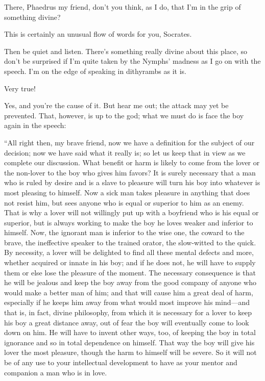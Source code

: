 There, Phaedrus my friend, don’t you think, as I do, that I’m in the
grip of something divine?

\sayphaedrus This is certainly an unusual flow of words for you, Socrates.

\saysocrates Then be quiet and listen. There’s something really divine
about this place, so don’t be surprised if I’m quite taken by the
Nymphs’ madness as I go on with the speech. I’m on the edge of
speaking in dithyrambs
as it is.

\sayphaedrus Very true!

\saysocrates Yes, and you’re the cause of it. But hear me out; the attack
may yet be prevented. That, however, is up to the god; what we must do
is face the boy again in the speech:

“All right then, my brave friend, now we have a definition for the
subject of our decision; now we have said what it really is; so let us
keep that in view as we complete our discussion. What benefit or
harm is likely to come from the lover or the non-lover to the boy who
gives him favors? It is surely necessary that a man who is ruled by
desire and is a slave to pleasure will turn his boy into whatever is
most pleasing to himself. Now a sick man takes pleasure in anything that
does not resist him, but sees anyone who is equal or
superior to him as an enemy. That is why a lover will not willingly put
up with a boyfriend who is his equal or superior, but is always working
to make the boy he loves weaker and inferior to himself. Now, the
ignorant man is inferior to the wise one, the coward to the brave, the
ineffective speaker to the trained orator, the slow-witted to the quick.
By necessity, a lover will be delighted to find all these mental defects
and more, whether acquired or innate in his boy; and if he does not, he
will have to supply them or else lose the pleasure of the moment. 
The necessary consequence is that he will be jealous and keep
the boy away from the good company of anyone who would make a better man
of him; and that will cause him a great deal of harm, especially if he
keeps him away from what would most improve his mind---and that is, in
fact, divine philosophy, from which it is necessary for a lover to keep
his boy a great distance away, out of fear the boy will eventually come
to look down on him. He will have to invent other ways, too, of keeping
the boy in total ignorance and so in total dependence on himself. That
way the boy will give his lover the most pleasure, though the
harm to himself will be severe. So it will not be of any use to your
intellectual development to have as your mentor and companion a man who
is in love.


